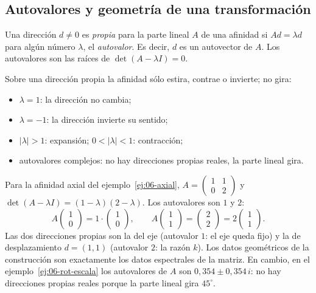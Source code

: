 \subsection{Autovalores y geometría de una transformación}\label{sec:autovalores-geom}

\begin{definicion}\label{def:06-direccion-propia}
Una dirección \(d\neq0\) es \emph{propia} para la parte lineal \(A\) de una afinidad si
\(Ad=\lambda d\) para algún número \(\lambda\), el \emph{autovalor}. Es decir, \(d\) es un
autovector de \(A\). Los autovalores son las raíces de \(\det(A-\lambda I)=0\).
\end{definicion}

Sobre una dirección propia la afinidad sólo estira, contrae o invierte; no gira:
\begin{itemize}
  \item \(\lambda=1\): la dirección no cambia;
  \item \(\lambda=-1\): la dirección invierte su sentido;
  \item \(|\lambda|>1\): expansión; \(0<|\lambda|<1\): contracción;
  \item autovalores complejos: no hay direcciones propias reales, la parte lineal gira.
\end{itemize}

\begin{ejemplo}\label{ej:06-autovalores-axial}
Para la afinidad axial del ejemplo~\ref{ej:06-axial}, \(A=\begin{pmatrix}1&1\\0&2\end{pmatrix}\)
y \(\det(A-\lambda I)=(1-\lambda)(2-\lambda)\). Los autovalores son \(1\) y \(2\):
\[
  A\begin{pmatrix}1\\0\end{pmatrix}=1\cdot\begin{pmatrix}1\\0\end{pmatrix},
  \qquad
  A\begin{pmatrix}1\\1\end{pmatrix}=\begin{pmatrix}2\\2\end{pmatrix}=2\begin{pmatrix}1\\1\end{pmatrix}.
\]
Las dos direcciones propias son la del eje (autovalor \(1\): el eje queda fijo) y la de
desplazamiento \(d=(1,1)\) (autovalor \(2\): la razón \(k\)). Los datos geométricos de la
construcción son exactamente los datos espectrales de la matriz. En cambio, en el
ejemplo~\ref{ej:06-rot-escala} los autovalores de \(A\) son \(0{,}354\pm0{,}354\,i\): no hay
direcciones propias reales porque la parte lineal gira \(45^\circ\).
\end{ejemplo}

